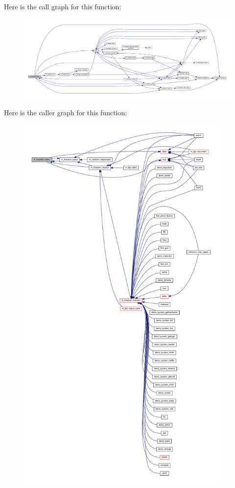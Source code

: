 Here is the call graph for this function\+:
\nopagebreak
\begin{figure}[H]
\begin{center}
\leavevmode
\includegraphics[width=350pt]{namespacem__kracken_ad0cfac1dcc02e0a67841f546cb57f823_cgraph}
\end{center}
\end{figure}
Here is the caller graph for this function\+:
\nopagebreak
\begin{figure}[H]
\begin{center}
\leavevmode
\includegraphics[height=550pt]{namespacem__kracken_ad0cfac1dcc02e0a67841f546cb57f823_icgraph}
\end{center}
\end{figure}
\mbox{\label{namespacem__kracken_a495ed7db5c2d301c4d5e623b62a9c295}} 

